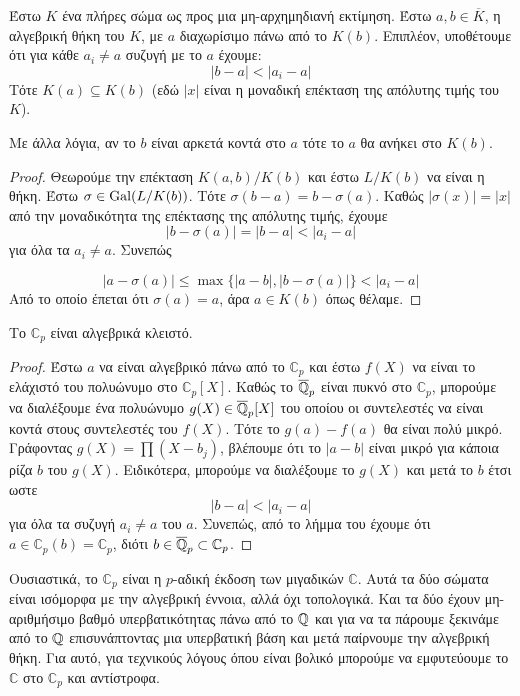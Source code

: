 \begin{lemma}[\tl{Krasner}]
	Έστω $K$ ένα πλήρες σώμα ως προς μια μη-αρχημηδιανή εκτίμηση. Έστω $a,b \in \overline{K}$, η αλγεβρική θήκη του $K$, με $a$ διαχωρίσιμο πάνω από το $K(b)$. Επιπλέον, υποθέτουμε ότι για κάθε $a_i \neq a$ συζυγή με το $a$ έχουμε:
	$$|b-a| < |a_i - a|$$
	Τότε $K(a)\subseteq K(b)$ (εδώ $|x|$ είναι η μοναδική επέκταση της απόλυτης τιμής του $K$).
\end{lemma}

\noindent Με άλλα λόγια, αν το $b$ είναι αρκετά κοντά στο $a$ τότε το $a$ θα ανήκει στο $K(b)$.
\begin{proof}
	Θεωρούμε την επέκταση $K(a,b)/K(b)$ και έστω $L/K(b)$ να είναι η  θήκη. Έστω $\sigma \in \operatorname{Gal}(L/K(b))$. Τότε $\sigma(b-a) = b -\sigma(a)$. Καθώς $|\sigma(x)| = |x|$ από την μοναδικότητα της επέκτασης της απόλυτης τιμής, έχουμε
	$$|b-\sigma(a) | = |b-a| < |a_i - a|$$ για όλα τα $a_i \neq a$. Συνεπώς 

	$$|a-\sigma(a)| \leq \max \{ |a-b|, |b-\sigma(a)|\} < |a_i-a|$$ Από το οποίο έπεται ότι $\sigma(a) =a$, άρα $a \in K(b)$ όπως θέλαμε.

\end{proof}

\begin{prop}
	Το $\mathbb{C}_p$ είναι αλγεβρικά κλειστό.
\end{prop}

\begin{proof}
	Έστω $a$ να είναι αλγεβρικό πάνω από το $\mathbb{C}_p$ και έστω $f(X)$ να είναι το ελάχιστό του πολυώνυμο στο $\mathbb{C}_p[X]$. Καθώς το $\overline{\mathbb{Q}}_p$ είναι πυκνό στο $\mathbb{C}_p$, μπορούμε να διαλέξουμε ένα πολυώνυμο $g(X) \in \overline{\mathbb{Q}}_p[X]$ του οποίου οι συντελεστές να είναι κοντά στους συντελεστές του $f(X)$. Τότε το $g(a) - f(a)$ θα είναι πολύ μικρό. Γράφοντας $g(X) = \prod (X-b_j)$, βλέπουμε ότι το $|a-b|$ είναι μικρό για κάποια ρίζα $b$ του $g(X)$. Ειδικότερα, μπορούμε να διαλέξουμε το $g(X)$ και μετά το $b$ έτσι ωστε
	$$|b-a| < |a_i -a|$$ για όλα τα συζυγή $a_i \neq a$ του $a$. Συνεπώς, από το λήμμα του  έχουμε ότι $a \in \mathbb{C}_p(b) = \mathbb{C}_p$, διότι $b \in \overline{\mathbb{Q}}_p \subset \mathbb{C}_p$.
\end{proof}


\noindent Ουσιαστικά, το $\mathbb{C}_p$ είναι η $p$-αδική έκδοση των μιγαδικών $\mathbb{C}$. Αυτά τα δύο σώματα είναι ισόμορφα με την 
αλγεβρική έννοια, αλλά όχι τοπολογικά. Και τα δύο έχουν μη-αριθμήσιμο βαθμό υπερβατικότητας πάνω από το $\mathbb{Q}$ και για να τα πάρουμε 
ξεκινάμε από το $\mathbb{Q}$ επισυνάπτοντας μια υπερβατική βάση και μετά παίρνουμε την αλγεβρική θήκη. Για αυτό, για τεχνικούς λόγους 
όπου είναι βολικό μπορούμε να εμφυτεύουμε το $\mathbb{C}$ στο $\mathbb{C}_p$ και αντίστροφα.

